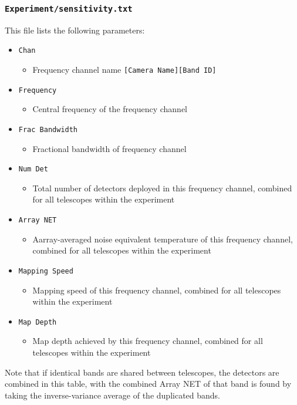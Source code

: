\documentclass[11pt]{article} %
\begin{document}
\subsubsection{\texttt{Experiment/sensitivity.txt}}

This file lists the following parameters:

\begin{itemize}[noitemsep,topsep=0pt]
	\item \texttt{Chan}
		\begin{itemize}[noitemsep,topsep=0pt]
		\item Frequency channel name \texttt{[Camera Name][Band ID]}
		\end{itemize}
	\item \texttt{Frequency}
		\begin{itemize}[noitemsep,topsep=0pt]
		\item Central frequency of the frequency channel
		\end{itemize}
	\item \texttt{Frac Bandwidth} 
		\begin{itemize}[noitemsep,topsep=0pt]
		\item Fractional bandwidth of frequency channel
		\end{itemize}
	\item \texttt{Num Det}
		\begin{itemize}[noitemsep,topsep=0pt]
		\item Total number of detectors deployed in this frequency channel, combined for all telescopes within the experiment
		\end{itemize}
	\item \texttt{Array NET}
		\begin{itemize}[noitemsep,topsep=0pt]
		\item Aarray-averaged noise equivalent temperature of this frequency channel, combined for all telescopes within the experiment
		\end{itemize}
	\item \texttt{Mapping Speed}
		\begin{itemize}[noitemsep,topsep=0pt]	
		\item Mapping speed of this frequency channel, combined for all telescopes within the experiment
		\end{itemize}
	\item \texttt{Map Depth}
		\begin{itemize}[noitemsep,topsep=0pt]
		\item Map depth achieved by this frequency channel, combined for all telescopes within the experiment
		\end{itemize}
\end{itemize}
Note that if identical bands are shared between telescopes, the detectors are combined in this table, with the combined Array NET of that band is found by taking the inverse-variance average of the duplicated bands.
\end{document}
